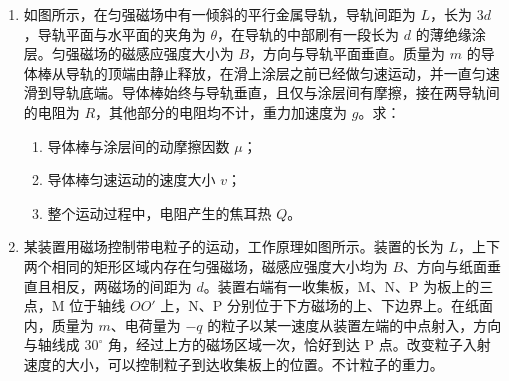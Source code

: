 \documentclass[\gkver]{gaokaozhenti}
\begin{document}
\begin{enumerate}
{\textbf{C．}（3）设 A、B 球碰撞后速度分别为 $v_{1}$ 和 $v_{2}$，由动量守恒定律 $2mv_{0}=2mv_{1}+mv_{2}$，且由题意知 $\frac{v_{2}-v_{1}}{v_{0}}=\frac{15}{16}$，解得 $v_{1}=\frac{17}{48}v_{0}$，$v_{2}=\frac{31}{24}v_{0}$。
}

\item
如图所示，在匀强磁场中有一倾斜的平行金属导轨，导轨间距为 $L$，长为 $3d$，导轨平面与水平面的夹角为 $\theta$，在导轨的中部刷有一段长为 $d$ 的薄绝缘涂层。匀强磁场的磁感应强度大小为 $B$，方向与导轨平面垂直。质量为 $m$ 的导体棒从导轨的顶端由静止释放，在滑上涂层之前已经做匀速运动，并一直匀速滑到导轨底端。导体棒始终与导轨垂直，且仅与涂层间有摩擦，接在两导轨间的电阻为 $R$，其他部分的电阻均不计，重力加速度为 $g$。求：

\begin{enumerate}
\item
导体棒与涂层间的动摩擦因数 $\mu$；
\item
导体棒匀速运动的速度大小 $v$；
\item
整个运动过程中，电阻产生的焦耳热 $Q$。
\end{enumerate}




\item
某装置用磁场控制带电粒子的运动，工作原理如图所示。装置的长为 $L$，上下两个相同的矩形区域内存在匀强磁场，磁感应强度大小均为 $B$、方向与纸面垂直且相反，两磁场的间距为 $d$。装置右端有一收集板，M、N、P 为板上的三点，M 位于轴线 $OO'$ 上，N、P 分别位于下方磁场的上、下边界上。在纸面内，质量为 $m$、电荷量为 $-q$ 的粒子以某一速度从装置左端的中点射入，方向与轴线成 $30^{\circ}$ 角，经过上方的磁场区域一次，恰好到达 P 点。改变粒子入射速度的大小，可以控制粒子到达收集板上的位置。不计粒子的重力。


\end{enumerate}
\end{document}
